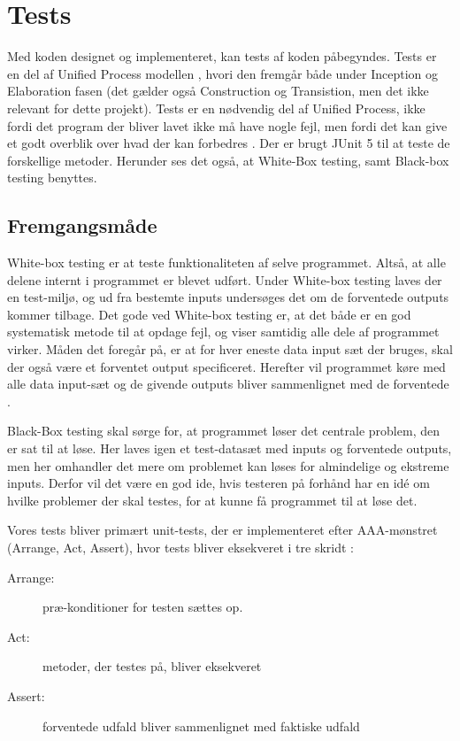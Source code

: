 \chapter{Tests}\label{ch:tests}
Med koden designet og implementeret, kan tests af koden påbegyndes. Tests er en del af Unified Process modellen \cite{UnifiedProcess}, hvori den fremgår både under Inception og Elaboration fasen (det gælder også Construction og Transistion, men det ikke relevant for dette projekt). Tests er en nødvendig del af Unified Process, ikke fordi det program der bliver lavet ikke må have nogle fejl, men fordi det kan give et godt overblik over hvad der kan forbedres \cite{sestoft2008systematic}. Der er brugt JUnit 5\cite{JUnit} til at teste de forskellige metoder. Herunder ses det også, at White-Box testing, samt Black-box testing benyttes. 

\section{Fremgangsmåde}
White-box testing er at teste funktionaliteten af selve programmet. Altså, at alle delene internt i programmet er blevet udført. Under White-box testing laves der en test-miljø, og ud fra bestemte inputs undersøges det om de forventede outputs kommer tilbage. Det gode ved White-box testing er, at det både er en god systematisk metode til at opdage fejl, og viser samtidig alle dele af programmet virker. Måden det foregår på, er at for hver eneste data input sæt der bruges, skal der også være et forventet output specificeret. Herefter vil programmet køre med alle data input-sæt og de givende outputs bliver sammenlignet med de forventede \cite{sestoft2008systematic}.

Black-Box testing skal sørge for, at programmet løser det centrale problem, den er sat til at løse. Her laves igen et test-datasæt med inputs og forventede outputs, men her omhandler det mere om problemet kan løses for almindelige og ekstreme inputs. Derfor vil det være en god ide, hvis testeren på forhånd har en idé om hvilke problemer der skal testes, for at kunne få programmet til at løse det\cite{sestoft2008systematic}. 

Vores tests bliver primært unit-tests, der er implementeret efter AAA-mønstret (Arrange, Act, Assert), hvor tests bliver eksekveret i tre skridt \cite{ArrangeActAssert}:
\begin{description}
    \item[Arrange:] præ-konditioner for testen sættes op.
    \item[Act:] metoder, der testes på, bliver eksekveret
    \item[Assert:] forventede udfald bliver sammenlignet med faktiske udfald 
\end{description}

